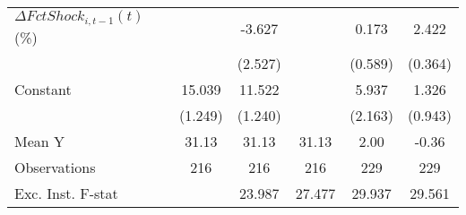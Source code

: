{\begin{tabular}{l*{5}{c}}
\addlinespace
$ \Delta FctShock_{i,t-1}(t)$ (\%)&                     &      -3.627         &                     &       0.173         &       2.422\sym{***}\\
                    &                     &     (2.527)         &                     &     (0.589)         &     (0.364)         \\
\addlinespace
Constant            &      15.039\sym{***}&      11.522\sym{***}&                     &       5.937\sym{**} &       1.326         \\
                    &     (1.249)         &     (1.240)         &                     &     (2.163)         &     (0.943)         \\
\midrule
Mean Y              &       31.13         &       31.13         &       31.13         &        2.00         &       -0.36         \\
Observations        &         216         &         216         &         216         &         229         &         229         \\
Exc. Inst. F-stat   &                     &      23.987         &      27.477         &      29.937         &      29.561         \\
\bottomrule
\end{tabular}
}
